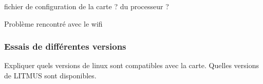 \color{red}
fichier de configuration de la carte ? du processeur ?

Problème rencontré avec le wifi
\color{black}


\subsubsection{Essais de différentes versions}
\color{red}
Expliquer quels versions de linux sont compatibles avec la carte. Quelles versions de LITMUS sont disponibles.
\color{black}